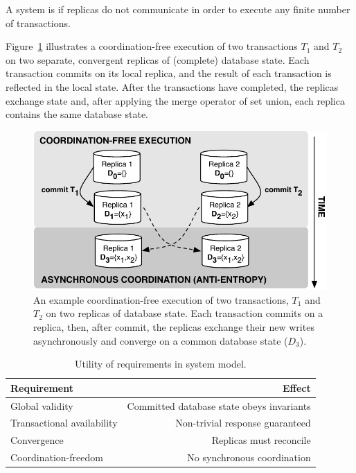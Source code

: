 \begin{definition}
A system is \textit{\cfree} if replicas do not communicate in order to
execute any finite number of transactions.
\end{definition}

Figure~\ref{fig:replicas} illustrates a coordination-free execution of
two transactions $T_1$ and $T_2$ on two separate, convergent replicas
of (complete) database state. Each transaction commits on its local
replica, and the result of each transaction is reflected in the local
state. After the transactions have completed, the replicas exchange
state and, after applying the merge operator of set union, each
replica contains the same database state.

\begin{figure}
\begin{center}
\includegraphics[width=.85\columnwidth]{figs/replicas.pdf}
\end{center}\vspace{-1em}
\caption{An example coordination-free execution of two transactions,
  $T_1$ and $T_2$ on two replicas of database state. Each transaction
  commits on a replica, then, after commit, the replicas exchange
  their new writes asynchronously and converge on a common database
  state ($D_3$).}
\label{fig:replicas}
\end{figure}


\begin{table}
\begin{center}
\small
\begin{tabular}{|l|r|}
\hline\textbf{Requirement} & \textbf{Effect}  \\\hline
Global validity & Committed database state obeys invariants  \\
Transactional availability & Non-trivial response guaranteed \\
Convergence & Replicas must reconcile \\
Coordination-freedom & No synchronous coordination\\\hline
\end{tabular}
\end{center}\vspace{-1em}
\caption{Utility of requirements in system model.}
\label{table:requirements}
\end{table}


